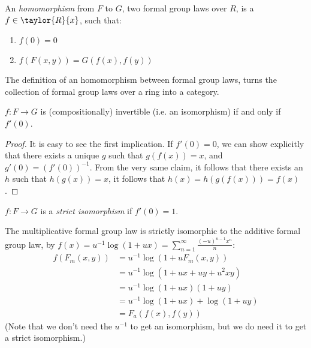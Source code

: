 \begin{definition*}
	An \emph{homomorphism} from $F$ to $G$, two formal group laws over $R$, is a $f \in \taylor{R}{x}$, such that:
	\begin{enumerate}
		\item $f\left(0\right) = 0$
		\item $f\left(F\left(x,y\right)\right) = G\left(f\left(x\right),f\left(y\right)\right)$
	\end{enumerate}
\end{definition*}

\begin{definition*}
	The definition of an homomorphism between formal group laws, turns the collection of formal group laws over a ring into a category.
\end{definition*}

\begin{claim*}
	$f: F \to G$ is (compositionally) invertible (i.e. an isomorphism) if and only if $f'\left(0\right)$.
\end{claim*}

\begin{proof}
	It is easy to see the first implication.
	If $f'\left(0\right) = 0$, we can show explicitly that there exists a unique $g$ such that $g\left(f\left(x\right)\right) = x$, and $g'\left(0\right) = \left(f'\left(0\right)\right)^{-1}$. From the very same claim, it follows that there exists an $h$ such that $h\left(g\left(x\right)\right) = x$, it follows that $h\left(x\right) = h\left(g\left(f\left(x\right)\right)\right) = f\left(x\right)$.
\end{proof}

\begin{definition*}
	$f: F \to G$ is a \emph{strict isomorphism} if $f'\left(0\right)=1$.
\end{definition*}

\begin{example*}
	The multiplicative formal group law is strictly isomorphic to the additive formal group law,
	by $f\left(x\right) = u^{-1} \log \left(1+ux\right) = \sum_{n=1}^{\infty} \frac{\left(-u\right)^{n-1} x^n}{n}$:
	\begin{align*}
		f\left(F_m\left(x,y\right)\right)
		&= u^{-1} \log \left(1+u F_m\left(x,y\right)\right)\\
		&= u^{-1} \log \left(1+ux+uy+u^2 xy\right)\\
		&= u^{-1} \log \left(1+ux\right)\left(1+uy\right)\\
		&= u^{-1} \log \left(1+ux\right) + \log \left(1+uy\right)\\
		&= F_a\left(f\left(x\right), f\left(y\right)\right)
	\end{align*}
	(Note that we don't need the $u^{-1}$ to get an isomorphism, but we do need it to get a strict isomorphism.)
\end{example*}

